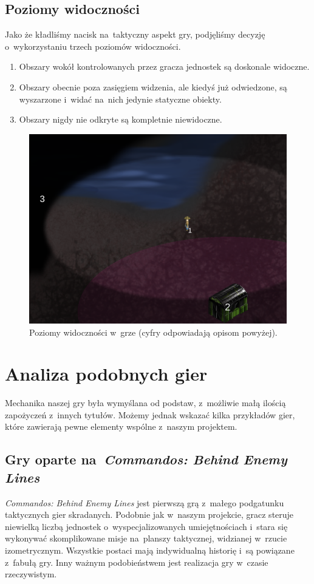 \documentclass[licencjacka]{pracamgr}
\begin{document}
    \subsection{Poziomy widoczności}
      Jako że kładliśmy nacisk na~taktyczny aspekt gry, podjęliśmy decyzję o~wykorzystaniu trzech poziomów widoczności. 
      \begin{enumerate}
       \item Obszary wokół kontrolowanych przez gracza jednostek są doskonale widoczne.
       \item Obszary obecnie poza zasięgiem widzenia, ale kiedyś już odwiedzone, są wyszarzone i~widać na~nich jedynie statyczne obiekty.
       \item Obszary nigdy nie odkryte są kompletnie niewidoczne.
      \end{enumerate}

      \begin{figure}[htbp]
	\centering
	\includegraphics[scale=0.4]{fow.png}
	\caption{Poziomy widoczności w~grze (cyfry odpowiadają opisom powyżej).}
      \end{figure}

  \section{Analiza podobnych gier}
    Mechanika naszej gry była wymyślana od podstaw, z~możliwie małą ilością zapożyczeń z~innych tytułów. Możemy jednak wskazać
    kilka przykładów gier, które zawierają pewne elementy wspólne z~naszym projektem.
    \subsection{Gry oparte na~\emph{Commandos: Behind Enemy Lines}}
      \emph{Commandos: Behind Enemy Lines} jest pierwszą grą z~małego podgatunku taktycznych gier skradanych. Podobnie jak
      w~naszym projekcie, gracz steruje niewielką liczbą jednostek o~wyspecjalizowanych umiejętnościach i~stara się wykonywać skomplikowane
      misje na~planszy taktycznej, widzianej w~rzucie izometrycznym. Wszystkie postaci mają indywidualną historię i~są powiązane
      z~fabułą gry. Inny ważnym podobieństwem jest realizacja gry w~czasie rzeczywistym.
\end{document}
